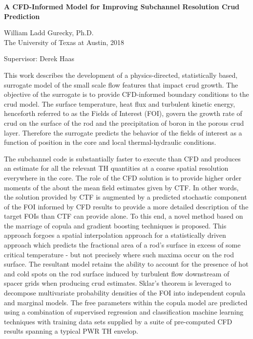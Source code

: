 
\begin{center}
    \large{
        \bf{A CFD-Informed Model for Improving Subchannel Resolution Crud Prediction}
    }
    \vspace{1cm}

    \small{

    William Ladd Gurecky, Ph.D. \\
    The University of Texas at Austin, 2018

    \vspace{1cm}
        Supervisor:  Derek Haas
    }
\end{center}
\vspace{1cm}

\small{
This work describes the development of a physics-directed, statistically based,
surrogate model of the small scale flow features that impact crud growth. The objective of the surrogate
is to provide CFD-informed boundary conditions to the crud model. The surface temperature, heat
flux and turbulent kinetic energy, henceforth referred to as the Fields of Interest (FOI),
govern the growth rate of crud on the surface of the rod and the
precipitation of boron in the porous crud layer. Therefore the surrogate predicts the behavior of the
fields of interest as a function of position in the core and local thermal-hydraulic conditions.

The subchannel code is substantially faster to execute than CFD
and produces an estimate for all the relevant TH quantities at a coarse spatial resolution everywhere in
the core. The role of the CFD solution is to provide higher order moments of the about the mean field estimates
given by CTF. In other words, the solution provided by CTF is augmented by a predicted stochastic
component of the FOI informed by CFD results to provide a more detailed description of the target
FOIs than CTF can provide alone. To this end, a novel method based on the marriage of copula and
gradient boosting techniques is proposed. This approach forgoes a spatial interpolation approach
for a statistically driven approach which predicts the fractional area of a rod’s surface in excess of some
critical temperature - but not precisely where such maxima occur on the rod surface.
The resultant model retains the ability to account for the presence
of hot and cold spots on the rod surface induced by turbulent flow downstream of spacer grids when
producing crud estimates. Sklar’s theorem is leveraged to decompose multivariate probability densities
of the FOI into independent copula and marginal models. The free parameters within the copula model
are predicted using a combination of supervised regression and classification machine learning techniques
with training data sets supplied by a suite of pre-computed CFD results spanning a typical PWR TH
envelop.
}
